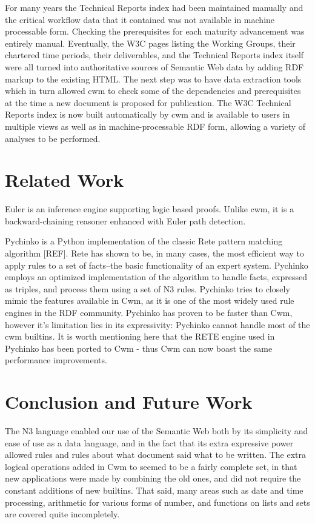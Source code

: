 \documentclass{tlp}
\begin{document}
\par For many years the Technical Reports index had been maintained
manually and the critical workflow data that it contained was not
available in machine processable form. Checking the prerequisites
for each maturity advancement was entirely manual. Eventually, the
W3C pages listing the Working Groups, their chartered time periods,
their deliverables, and the Technical Reports index itself were all
turned into authoritative sources of Semantic Web data by adding
RDF markup to the existing HTML. The next step was to have data
extraction tools which in turn allowed cwm to check some of the
dependencies and prerequisites at the time a new document is
proposed for publication. The W3C Technical Reports index is now
built automatically by cwm and is available to users in multiple
views as well as in machine-processable RDF form, allowing a
variety of analyses to be performed.
\section{Related Work}
  

\par Euler is an inference engine supporting logic based proofs.
Unlike cwm, it is a backward-chaining reasoner enhanced with Euler
path detection.

\par Pychinko is a Python implementation of the classic Rete pattern
matching algorithm [REF]. Rete has shown to be, in many cases, the
most efficient way to apply rules to a set of facts--the basic
functionality of an expert system. Pychinko employs an optimized
implementation of the algorithm to handle facts, expressed as
triples, and process them using a set of N3 rules. Pychinko tries
to closely mimic the features available in Cwm, as it is one of the
most widely used rule engines in the RDF community. Pychinko has
proven to be faster than Cwm, however it's limitation lies in its
expressivity: Pychinko cannot handle most of the cwm builtins. It
is worth mentioning here that the RETE engine used in Pychinko has
been ported to Cwm - thus Cwm can now boast the same performance
improvements.
\section{Conclusion and Future Work}
  

\par The N3 language enabled our use of the Semantic Web both by its
simplicity and ease of use as a data language, and in the fact that
its extra expressive power allowed rules and rules about what
document said what to be written. The extra logical operations
added in Cwm to seemed to be a fairly complete set, in that new
applications were made by combining the old ones, and did not
require the constant additions of new builtins. That said, many
areas such as date and time processing, arithmetic for various
forms of number, and functions on lists and sets are covered quite
incompletely.
\end{document}
